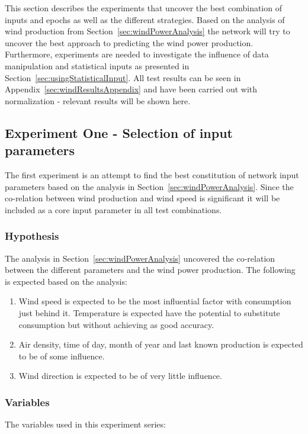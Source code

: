 This section describes the experiments that uncover the best combination of inputs and epochs as well as the different strategies. Based on the analysis of wind production from Section~\ref{sec:windPowerAnalysis} the network will try to uncover the best approach to predicting the wind power production. Furthermore, experiments are needed to investigate the influence of data manipulation and statistical inputs as presented in Section~\ref{sec:usingStatisticalInput}. All test results can be seen in Appendix~\ref{sec:windResultsAppendix} and have been carried out with normalization - relevant results will be shown here. 


\subsection{Experiment One - Selection of input parameters}
The first experiment is an attempt to find the best constitution of network input parameters based on the analysis in Section~\ref{sec:windPowerAnalysis}. Since the co-relation between wind production and wind speed is significant it will be included as a core input parameter in all test combinations.

\subsubsection{Hypothesis}
The analysis in Section~\ref{sec:windPowerAnalysis} uncovered the co-relation between the different parameters and the wind power production. The following is expected based on the analysis:

\begin{enumerate}
\item Wind speed is expected to be the most influential factor with consumption just behind it. Temperature is expected have the potential to substitute consumption but without achieving as good accuracy. 
\item Air density, time of day, month of year and last known production is expected to be of some influence.
\item Wind direction is expected to be of very little influence.
\end{enumerate}

\subsubsection{Variables}
The variables used in this experiment series:

